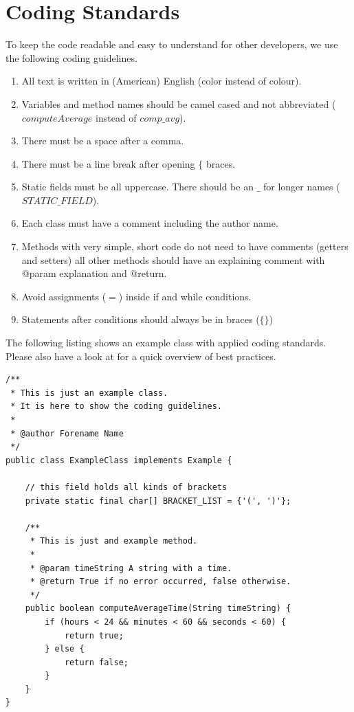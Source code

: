 \documentclass[a4paper,twoside]{book}      %
\begin{document}
\section{Coding Standards}
To keep the code readable and easy to understand for other developers, we use the following coding guidelines.
\begin{enumerate}
\item All text is written in (American) English (color instead of colour).
\item Variables and method names should be camel cased and not abbreviated ($computeAverage$ instead of $comp\_avg$).
\item There must be a space after a comma.
\item There must be a line break after opening $\{$ braces.
\item Static fields must be all uppercase. There should be an $\_$ for longer names ($STATIC\_FIELD$).
\item Each class must have a comment including the author name.
\item Methods with very simple, short code do not need to have comments (getters and setters) all other methods should have an explaining comment with @param explanation and @return.
\item Avoid assignments ($=$) inside if and while conditions.
\item Statements after conditions should always be in braces ($\{\}$)
\end{enumerate}

The following listing shows an example class with applied coding standards. Please also have a look at \cite{codingStandards} for a quick overview of best practices.

\begin{codelisting}
\begin{lstlisting}[frame=tb]
/**
 * This is just an example class.
 * It is here to show the coding guidelines.
 * 
 * @author Forename Name
 */
public class ExampleClass implements Example {

	// this field holds all kinds of brackets
	private static final char[] BRACKET_LIST = {'(', ')'};

	/**
	 * This is just and example method.
	 * 
	 * @param timeString A string with a time.
	 * @return True if no error occurred, false otherwise.
	 */
	public boolean computeAverageTime(String timeString) {
		if (hours < 24 && minutes < 60 && seconds < 60) {
			return true;
		} else {
			return false;
		}
	}
}
\end{lstlisting}
\end{codelisting}
\end{document}
